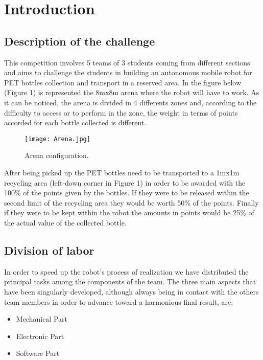 %
%   
%

\chapter{Introduction}

\section{Description of the challenge}
This competition involves 5 teams of 3 students coming from different sections and aims to challenge the students in building  an autonomous mobile robot for PET bottles collection and transport in a reserved area.
In the figure below (Figure 1) is represented the 8mx8m arena where the robot will have to work.
As it can be noticed, the arena is divided in 4 differents zones and, according to the difficulty to access or to perform in the zone, the weight in terms of points accorded for each bottle collected is different.

\begin{figure}[H]
  \centering
  \texttt{[image: Arena.jpg]}
  \caption{Arena configuration.}
\label{fig:Arena}
\end{figure}

After being picked up the PET bottles need to be transported to a 1mx1m recycling area (left-down corner in Figure 1) in order to be awarded with the 100\% of the points given by the bottles.
If they were to be released within the second limit of the recycling area they would be worth 50\% of the points. Finally if they were to be kept within the robot the amounts in points would be 25\% of the actual value of the collected bottle. 

\section{Division of labor}
In order to speed up the robot’s process of realization we have distributed the principal tasks among the components of the team.
The  three main aspects that have been singularly developed, although always being in contact with the others team members in order to advance toward a harmonious final result, are:
\begin{itemize}
\item Mechanical Part
\item Electronic Part
\item Software Part
\end{itemize}

